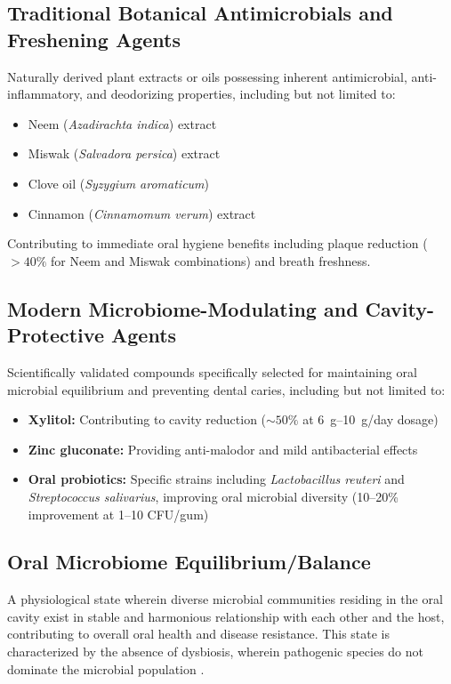 \documentclass[12pt]{article}
\begin{document}
\subsection*{Traditional Botanical Antimicrobials and Freshening Agents}
Naturally derived plant extracts or oils possessing inherent antimicrobial, anti-inflammatory, and deodorizing properties, including but not limited to:
\begin{itemize}
    \item Neem (\textit{Azadirachta indica}) extract
    \item Miswak (\textit{Salvadora persica}) extract  
    \item Clove oil (\textit{Syzygium aromaticum})
    \item Cinnamon (\textit{Cinnamomum verum}) extract
\end{itemize}
Contributing to immediate oral hygiene benefits including plaque reduction ($>40\%$ for Neem and Miswak combinations) and breath freshness.

\subsection*{Modern Microbiome-Modulating and Cavity-Protective Agents}
Scientifically validated compounds specifically selected for maintaining oral microbial equilibrium and preventing dental caries, including but not limited to:
\begin{itemize}
    \item \textbf{Xylitol:} Contributing to cavity reduction ($\sim50\%$ at \SIrange{6}{10}{\gram}/day dosage)
    \item \textbf{Zinc gluconate:} Providing anti-malodor and mild antibacterial effects
    \item \textbf{Oral probiotics:} Specific strains including \textit{Lactobacillus reuteri} and \textit{Streptococcus salivarius}, improving oral microbial diversity (10--20\% improvement at \SIrange{1}{10}{\billion} CFU/gum)
\end{itemize}

\subsection*{Oral Microbiome Equilibrium/Balance}
A physiological state wherein diverse microbial communities residing in the oral cavity exist in stable and harmonious relationship with each other and the host, contributing to overall oral health and disease resistance. This state is characterized by the absence of dysbiosis, wherein pathogenic species do not dominate the microbial population \cite{Fang2024}.
\end{document}

